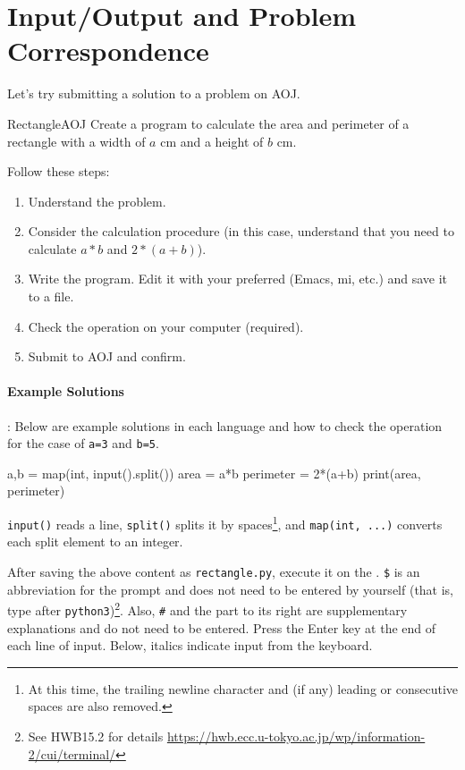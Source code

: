 \section{Input/Output and Problem Correspondence}

Let's try submitting a solution to a problem on AOJ.

\begin{psbox}{Rectangle}{AOJ}
Create a program to calculate the area and perimeter of a rectangle with a width of $a$ cm and a height of $b$ cm.
\end{psbox}

Follow these steps:
\begin{enumerate}
\item Understand the problem.
\item Consider the calculation procedure (in this case, understand that you need to calculate $a*b$ and $2*(a+b)$).
\item Write the program. Edit it with your preferred (Emacs, mi, etc.) and save it to a file.
\item Check the operation on your computer (required).
\item Submit to AOJ and confirm.
\end{enumerate}

\paragraph{Example Solutions}: Below are example solutions in each language and how to check the operation for the case of \texttt{a=3} and \texttt{b=5}.

\begin{pybox}
a,b = map(int, input().split())
area = a*b
perimeter = 2*(a+b)
print(area, perimeter)
\end{pybox}

\texttt{input()} reads a line, \texttt{split()} splits it by spaces\footnote{At this time, the trailing newline character and (if any) leading or consecutive spaces are also removed.}, and \texttt{map(int, ...)} converts each split element to an integer.

After saving the above content as \texttt{rectangle.py}, execute it on the . \texttt{\$} is an abbreviation for the prompt and does not need to be entered by yourself (that is, type after \texttt{python3})\footnote{See HWB15.2 for details \url{https://hwb.ecc.u-tokyo.ac.jp/wp/information-2/cui/terminal/}}. Also, \texttt{\#} and the part to its right are supplementary explanations and do not need to be entered. Press the Enter key at the end of each line of input. Below, italics indicate input from the keyboard.


